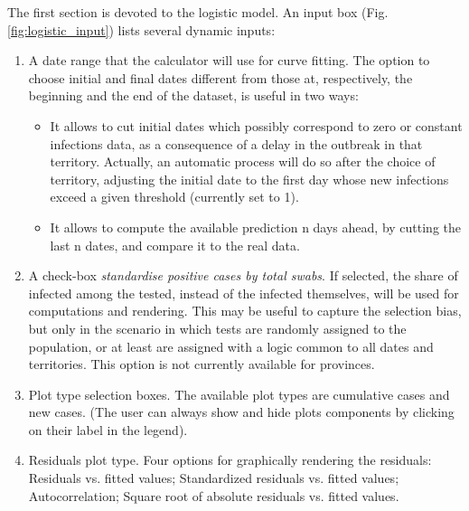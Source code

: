 \documentclass[
12pt, %
a4paper, %
oneside, %
headinclude,footinclude, %
BCOR5mm, %
]{scrartcl}
\begin{document}
The first section is devoted to the logistic model. An input box (Fig.\ref{fig:logistic_input}) lists several dynamic inputs:
\begin{enumerate}
\item A date range that the calculator will use for curve fitting. The option to choose initial and final dates different from those at, respectively, the beginning and the end of the dataset, is useful in two ways: 
\begin{itemize} 
\item It allows to cut initial dates which possibly correspond to zero or constant infections data, as a consequence of a delay in the outbreak in that territory. Actually, an automatic process will do so after the choice of territory, adjusting the initial date to the first day whose new infections exceed a given threshold (currently set to 1). 
\item It allows to compute the available prediction n days ahead, by cutting the last n dates, and compare it to the real data.
\end{itemize}
\item A check-box \emph{standardise positive cases by total swabs}. If selected, the share of infected among the tested, instead of the infected themselves, will be used for computations and rendering. This may be useful to capture the selection bias, but only in the scenario in which tests are randomly assigned to the population, or at least are assigned with a logic common to all dates and territories. This option is not currently available for provinces.
\item Plot type selection boxes. The available plot types are cumulative cases and new cases. (The user can always show and hide plot\textquotesingle  s components by clicking on their label in the legend).
\item Residuals plot type. Four options for graphically rendering the residuals: Residuals vs. fitted values; Standardized residuals vs. fitted values; Autocorrelation; Square root of absolute residuals vs. fitted values.
\end{enumerate}
\end{document}
